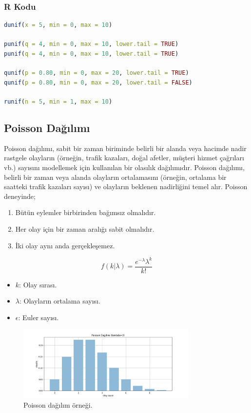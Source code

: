 \subsubsection{R Kodu}

\begin{lstlisting}[language=R]
dunif(x = 5, min = 0, max = 10)

punif(q = 4, min = 0, max = 10, lower.tail = TRUE)
punif(q = 4, min = 0, max = 10, lower.tail = TRUE)

qunif(p = 0.80, min = 0, max = 20, lower.tail = TRUE)
qunif(p = 0.80, min = 0, max = 20, lower.tail = FALSE)

runif(n = 5, min = 1, max = 10)
\end{lstlisting}

\newpage

\subsection{Poisson Dağılımı}
Poisson dağılımı, sabit bir zaman biriminde belirli bir alanda veya hacimde nadir rastgele olayların (örneğin, trafik kazaları, doğal afetler, müşteri hizmet çağrıları vb.) sayısını modellemek için kullanılan bir olasılık dağılımıdır. Poisson dağılımı, belirli bir zaman veya alanda olayların ortalamasını (örneğin, ortalama bir saatteki trafik kazaları sayısı) ve olayların beklenen nadirliğini temel alır. Poisson deneyinde;

\begin{enumerate}
	\item Bütün eylemler birbirinden bağımsız olmalıdır.
	\item Her olay için bir zaman aralığı sabit olmalıdır.
	\item İki olay aynı anda gerçekleşemez.
\end{enumerate}

\[f(k|\lambda) = \frac{e^{-\lambda} \lambda^k}{k!}\]
\begin{itemize}
	\item $k$: Olay sırası.
	\item $\lambda$: Olayların ortalama sayısı.
	\item $\epsilon$: Euler sayısı.
\end{itemize}

\begin{figure}[h]
    \centering
    \includegraphics[width=0.8\textwidth]{images/poisson_distribution.png}
    \caption{Poisson dağılım örneği.}
    \label{fig:enter-label}
\end{figure}

